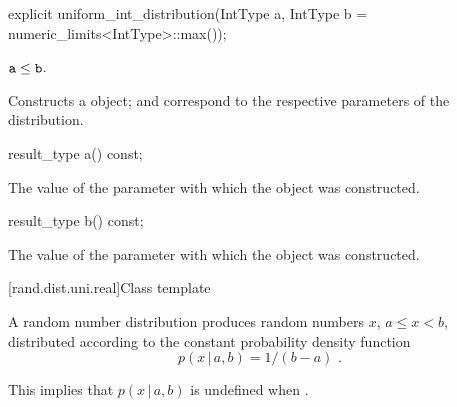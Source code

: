 %
\begin{itemdecl}
explicit uniform_int_distribution(IntType a, IntType b = numeric_limits<IntType>::max());
\end{itemdecl}

\begin{itemdescr}
\pnum\requires
 $\texttt{a} \leq \texttt{b}$.

\pnum\effects Constructs a  object;
  and 
 correspond to the respective parameters of the distribution.
\end{itemdescr}

%
\begin{itemdecl}
result_type a() const;
\end{itemdecl}

\begin{itemdescr}
\pnum\returns The value of the  parameter
 with which the object was constructed.
\end{itemdescr}

%
\begin{itemdecl}
result_type b() const;
\end{itemdecl}

\begin{itemdescr}
\pnum\returns The value of the  parameter
 with which the object was constructed.
\end{itemdescr}


[rand.dist.uni.real]{Class template }%
%
%

\pnum
A  random number distribution
produces random numbers $x$,
$a \leq x < b$,
distributed according to
the constant probability density function%
%
%
\[ p(x\,|\,a,b) = 1 / (b - a) \text{ .} \]
\begin{note}
This implies that $p(x\,|\,a,b)$ is undefined when .
\end{note}

